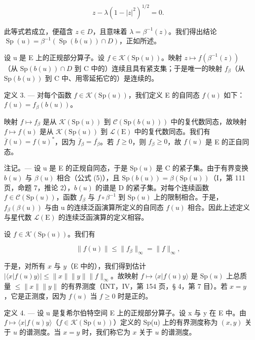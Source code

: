 \[
z - \lambda (1 - | z | ^ {2}) ^ {1 / 2} = 0.
\]

此等式若成立，便蕴含 \(z \in D\)，且意味着 \(\lambda = \beta^{-1}(z)\)。我们得出结论 \(\operatorname{Sp}(u) = \beta^{-1}(\operatorname{Sp}(b(u)) \cap D)\)，正如所述。

设 u 是 E 上的正规部分算子。设 \(f \in \mathcal{K}(\mathrm{Sp}(u))\)。映射 \(z \mapsto f(\beta^{-1}(z))\)（从 \(\mathrm{Sp}(b(u)) \cap D\) 到 C 中的）连续且具有紧支集；于是唯一的映射 \(f_{\beta}\)（从 \(\mathrm{Sp}(b(u))\) 到 C 中、用零延拓它的）是连续的。

定义 3. --- 对每个函数 \(f \in \mathcal{K}(\mathrm{Sp}(u))\)，我们定义 E 的自同态 \(f(u)\) 如下：\(f(u) = f_{\beta}(b(u))\)。

映射 \(f \mapsto f_{\beta}\) 是从 \(\mathcal{K}(\mathrm{Sp}(u))\) 到 \(\mathcal{C}(\mathrm{Sp}(b(u)))\) 中的复代数同态，故映射 \(f \mapsto f(u)\) 是从 \(\mathcal{K}(\mathrm{Sp}(u))\) 到 \(\mathcal{L}(\mathrm{E})\) 中的复代数同态。我们有 \(\overline{f}(u) = f(u)^*\)，因为 \(\overline{f}_{\beta} = \overline{f_{\beta}}\)。若 \(f \geqslant 0\)，则 \(f_{\beta} \geqslant 0\)，故 \(f(u)\) 是 E 的正自同态。

注记。--- 设 u 是 E 的正规自同态，于是 \(\mathrm{Sp}(u)\) 是 C 的紧子集。由于有界变换 \(b(u)\) 与 \(\beta(u)\) 相合（公式 (5)），且 \(\mathrm{Sp}(b(u)) = \beta(\mathrm{Sp}(u))\)（I，第 111 页，命题 7，推论 2），\(b(u)\) 的谱是 D 的紧子集。对每个连续函数 \(f \in \mathcal{C}(\mathrm{Sp}(u))\)，函数 \(f_{\beta}\) 与 \(f \circ \beta^{-1}\) 到 \(\mathrm{Sp}(u)\) 上的限制相合。于是，\(f_{\beta}(\beta(u))\) 与由 u 的连续泛函演算所定义的自同态 \(f(u)\) 相合。因此上述定义与星代数 \(\mathcal{L}(\mathrm{E})\) 的连续泛函演算的定义相容。

设 \(f\in \mathcal{K}(\mathrm{Sp}(u))\)。我们有

\[
\| f (u) \| \leqslant \| f _ {\beta} \| _ {\infty} = \| f \| _ {\infty},
\]

于是，对所有 \(x\) 与 \(y\)（E 中的），我们得到估计 \(|\langle x | f(u)y\rangle| \leqslant \|x\|\|y\|\|f\|_{\infty}\)。故映射 \(f \mapsto \langle x | f(u)y\rangle\) 是 \(\mathrm{Sp}(u)\) 上总质量 \(\leqslant \|x\|\|y\|\) 的有界测度（INT，IV，第 154 页，§ 4，第 7 目）。若 \(x = y\)，它是正测度，因为 \(f(u)\) 当 \(f \geqslant 0\) 时是正的。

定义 4. --- 设 u 是复希尔伯特空间 E 上的正规部分算子。设 x 与 y 在 E 中。由 \(f \mapsto \langle x | f(u)y \rangle\)（\(f \in \mathcal{K}(\mathrm{Sp}(u))\)）定义的 Sp(u) 上的有界测度称为 \((x,y)\) 关于 \(u\) 的谱测度。当 \(x = y\) 时，我们称它为 \(x\) 关于 \(u\) 的谱测度。

